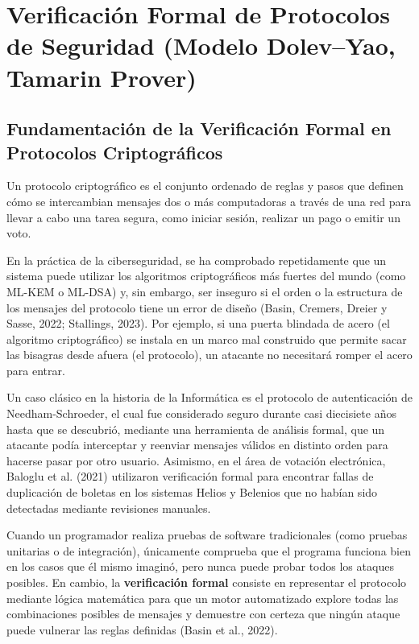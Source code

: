 \section{Verificación Formal de Protocolos de Seguridad (Modelo Dolev--Yao, Tamarin Prover)}

\subsection{Fundamentación de la Verificación Formal en Protocolos Criptográficos}

Un protocolo criptográfico es el conjunto ordenado de reglas y pasos que definen cómo se intercambian mensajes dos o más computadoras a través de una red para llevar a cabo una tarea segura, como iniciar sesión, realizar un pago o emitir un voto.

En la práctica de la ciberseguridad, se ha comprobado repetidamente que un sistema puede utilizar los algoritmos criptográficos más fuertes del mundo (como ML-KEM o ML-DSA) y, sin embargo, ser inseguro si el orden o la estructura de los mensajes del protocolo tiene un error de diseño (Basin, Cremers, Dreier y Sasse, 2022; Stallings, 2023). Por ejemplo, si una puerta blindada de acero (el algoritmo criptográfico) se instala en un marco mal construido que permite sacar las bisagras desde afuera (el protocolo), un atacante no necesitará romper el acero para entrar.

Un caso clásico en la historia de la Informática es el protocolo de autenticación de Needham-Schroeder, el cual fue considerado seguro durante casi diecisiete años hasta que se descubrió, mediante una herramienta de análisis formal, que un atacante podía interceptar y reenviar mensajes válidos en distinto orden para hacerse pasar por otro usuario. Asimismo, en el área de votación electrónica, Baloglu et al. (2021) utilizaron verificación formal para encontrar fallas de duplicación de boletas en los sistemas Helios y Belenios que no habían sido detectadas mediante revisiones manuales.

Cuando un programador realiza pruebas de software tradicionales (como pruebas unitarias o de integración), únicamente comprueba que el programa funciona bien en los casos que él mismo imaginó, pero nunca puede probar todos los ataques posibles. En cambio, la \textbf{verificación formal} consiste en representar el protocolo mediante lógica matemática para que un motor automatizado explore todas las combinaciones posibles de mensajes y demuestre con certeza que ningún ataque puede vulnerar las reglas definidas (Basin et al., 2022).

